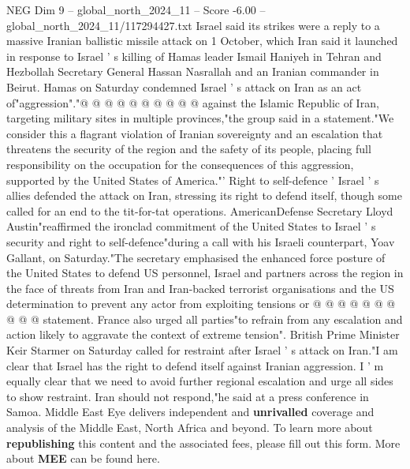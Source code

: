 \begin{textsample}{NEG Dim 9 – global\_north\_2024\_11 – Score -6.00 – global\_north\_2024\_11/117294427.txt}
Israel said its strikes were a reply to a massive Iranian ballistic missile attack on 1 October, which Iran said it launched in response to Israel ' s killing of Hamas leader Ismail Haniyeh in Tehran and Hezbollah Secretary General Hassan Nasrallah and an Iranian commander in Beirut.
Hamas on Saturday condemned Israel ' s attack on Iran as an act of"aggression"."@ @ @ @ @ @ @ @ @ @ against the Islamic Republic of Iran, targeting military sites in multiple provinces,"the group said in a statement."We consider this a flagrant violation of Iranian sovereignty and an escalation that threatens the security of the region and the safety of its people, placing full responsibility on the occupation for the consequences of this aggression, supported by the United States of America."' Right to self-defence ' Israel ' s allies defended the attack on Iran, stressing its right to defend itself, though some called for an end to the tit-for-tat operations.
AmericanDefense Secretary Lloyd Austin"reaffirmed the ironclad commitment of the United States to Israel ' s security and right to self-defence"during a call with his Israeli counterpart, Yoav Gallant, on Saturday."The secretary emphasised the enhanced force posture of the United States to defend US personnel, Israel and partners across the region in the face of threats from Iran and Iran-backed terrorist organisations and the US determination to prevent any actor from exploiting tensions or @ @ @ @ @ @ @ @ @ @ statement.
France also urged all parties"to refrain from any escalation and action likely to aggravate the context of extreme tension".
British Prime Minister Keir Starmer on Saturday called for restraint after Israel ' s attack on Iran."I am clear that Israel has the right to defend itself against Iranian aggression.
I ' m equally clear that we need to avoid further regional escalation and urge all sides to show restraint.
Iran should not respond,"he said at a press conference in Samoa.
Middle East Eye delivers independent and \textbf{unrivalled} coverage and analysis of the Middle East, North Africa and beyond.
To learn more about \textbf{republishing} this content and the associated fees, please fill out this form.
More about \textbf{MEE} can be found here.

\end{textsample}
